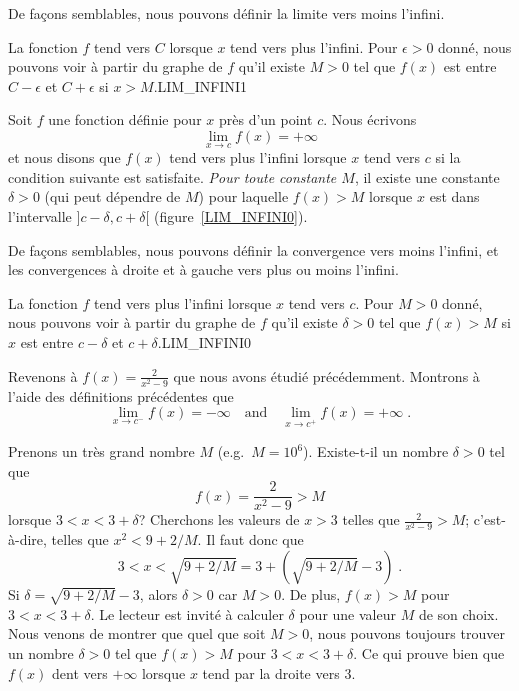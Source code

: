 {\begin{focus}{\dfn}
De façons semblables, nous pouvons définir la limite vers moins l'infini.
\label{epM_def_of_lim_at_inf}
\end{focus}

{La fonction $f$ tend vers $C$ lorsque $x$ tend vers plus l'infini.
Pour $\epsilon>0$ donné, nous pouvons voir à partir du graphe de $f$ qu'il
existe $M>0$ tel que $f(x)$ est entre $C-\epsilon$ et $C+\epsilon$ si
$x>M$.}{LIM_INFINI1}

\begin{focus}{\dfn} 
Soit $f$ une fonction définie pour $x$ près d'un point $c$.  Nous écrivons
\[
\lim_{x\rightarrow c} f(x) = +\infty
\]
et nous disons que $f(x)$ tend vers plus l'infini lorsque $x$ tend vers $c$
si la condition suivante est satisfaite.
{\em Pour toute constante $M$}, il existe une constante $\delta>0$
(qui peut dépendre de $M$) pour laquelle $f(x) > M$ lorsque $x$ est
dans l'intervalle $]c-\delta,c+\delta[$ (figure~\ref{LIM_INFINI0}).

De façons semblables, nous pouvons définir la convergence vers moins
l'infini, et les convergences à droite et à gauche vers plus ou moins
l'infini.
\end{focus}

{La fonction $f$ tend vers plus l'infini lorsque $x$ tend vers
$c$.  Pour $M>0$ donné, nous pouvons voir à partir du graphe de $f$ qu'il
existe $\delta>0$ tel que $f(x)>M$ si $x$ est entre $c-\delta$ et
$c+\delta$.}{LIM_INFINI0}

\begin{egg}
Revenons à $\displaystyle f(x) = \frac{2}{x^2-9}$ que nous avons étudié
précédemment.  Montrons à l'aide des définitions précédentes que 
\[
\lim_{x\rightarrow c^-} f(x) = -\infty \quad \text{and} \quad
\lim_{x\rightarrow c^+} f(x) = +\infty \; .
\]

Prenons un très grand nombre $M$ (e.g.\ $M=10^6$).  Existe-t-il un
nombre $\delta>0$ tel que
\[
f(x)=\frac{2}{x^2-9} > M
\]
lorsque $3<x<3+\delta$?  Cherchons les valeurs de $x>3$ telles que
$\displaystyle \frac{2}{x^2-9} > M$; c'est-à-dire, telles que
$x^2 < 9 + 2/M$.  Il faut donc que
\[
3<x < \sqrt{9+2/M} = 3 + \left(\sqrt{9+2/M} - 3\right) \; .
\]
Si $\delta = \sqrt{9+2/M} - 3$, alors $\delta > 0$ car
$M>0$.  De plus, $f(x)>M$ pour $3<x<3+\delta$.  Le lecteur est invité à
calculer $\delta$ pour une valeur $M$ de son choix.  Nous venons de
montrer que quel que soit $M>0$, nous pouvons toujours trouver un nombre
$\delta>0$ tel que $f(x)>M$ pour $3<x<3+\delta$.  Ce qui prouve bien
que $f(x)$ dent vers $+\infty$ lorsque $x$ tend par la droite vers
$3$.


\end{egg}}
